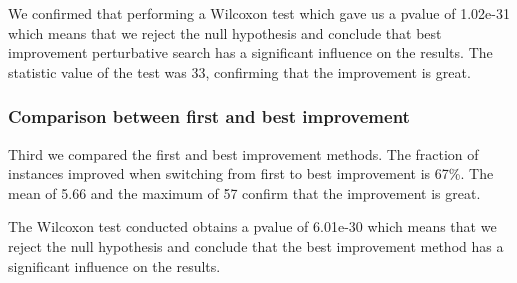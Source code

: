 \documentclass[a4paper,12pt]{article}
\begin{document}
We confirmed that performing a Wilcoxon test which gave us a pvalue of 1.02e-31 which means that we reject the null hypothesis and conclude that best improvement perturbative search has a significant influence on the results. The statistic value of the test was 33, confirming that the improvement is great.

\subsubsection{Comparison between first and best improvement}

Third we compared the first and best improvement methods. The fraction of instances improved when switching from first to best improvement is 67\%. The mean of 5.66 and the maximum of 57 confirm that the improvement is great.

The Wilcoxon test conducted obtains a pvalue of 6.01e-30 which means that we reject the null hypothesis and conclude that the best improvement method has a significant influence on the results.


\end{document}
